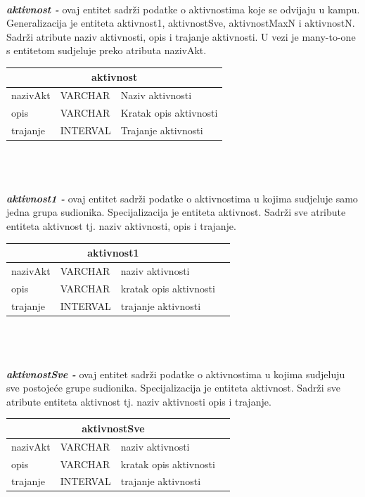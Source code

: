 \\
\textbf{\textit{aktivnost -}} ovaj entitet sadrži podatke o aktivnostima koje se odvijaju u kampu. Generalizacija je entiteta aktivnost1, aktivnostSve, aktivnostMaxN i aktivnostN. Sadrži atribute naziv aktivnosti, opis i trajanje aktivnosti. U vezi je many-to-one s entitetom sudjeluje preko atributa nazivAkt. \\
\begin{tabular}{|l|l|l|}
	
	\hline \multicolumn{3}{|c|}{\textbf{aktivnost}}	\\ \hline
	
	\cellcolor{aquamarine}nazivAkt & VARCHAR &  Naziv aktivnosti\\ \hline 
	opis &	VARCHAR	& Kratak opis aktivnosti\\ \hline
	trajanje & INTERVAL & Trajanje aktivnosti\\ \hline
\end{tabular} \\ \\
\\
\textbf{\textit{aktivnost1 -}} ovaj entitet sadrži podatke o aktivnostima u kojima sudjeluje samo jedna grupa sudionika. Specijalizacija je entiteta aktivnost. Sadrži sve atribute entiteta aktivnost tj. naziv aktivnosti, opis i trajanje.\\
\begin{tabular}{|l|l|l|l|}
	
	\hline \multicolumn{3}{|c|}{\textbf{aktivnost1}}\\ \hline
	
	\cellcolor{aquamarine}nazivAkt & VARCHAR	&  	naziv aktivnosti\\ \hline 
	opis	&	VARCHAR	&	kratak opis aktivnosti\\ \hline
	trajanje & INTERVAL & trajanje aktivnosti\\ \hline
\end{tabular} \\ \\
\\
\textit{\textbf{aktivnostSve -}} ovaj entitet sadrži podatke o aktivnostima u kojima sudjeluju sve postojeće grupe sudionika. Specijalizacija je entiteta aktivnost. Sadrži sve atribute entiteta aktivnost tj. naziv aktivnosti opis i trajanje.\\
\begin{tabular}{|l|l|l|l|}
	
	\hline \multicolumn{3}{|c|}{\textbf{aktivnostSve}}	\\  \hline
	
	\cellcolor{aquamarine}nazivAkt & VARCHAR	&  	naziv aktivnosti\\ \hline 
	opis	&	VARCHAR	&	kratak opis aktivnosti\\ \hline
	trajanje & INTERVAL & trajanje aktivnosti\\ \hline
\end{tabular} \\ \\
